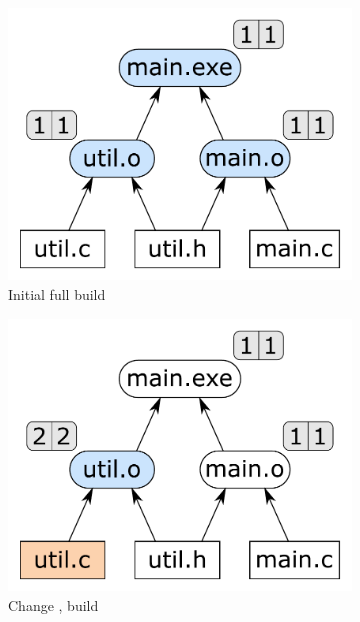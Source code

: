 \begin{figure}%
\begin{subfigure}[b]{0.32\linewidth}
\centerline{\includegraphics[scale=0.28]{fig/step-example-step1.pdf}}
\caption{Initial full build}
\end{subfigure}
\hfill
\begin{subfigure}[b]{0.32\linewidth}
\centerline{\includegraphics[scale=0.28]{fig/step-example-step2.pdf}}
\caption{Change , build }
\end{subfigure}
\hfill
\begin{subfigure}[b]{0.33\linewidth}

\end{subfigure}
\end{figure}
